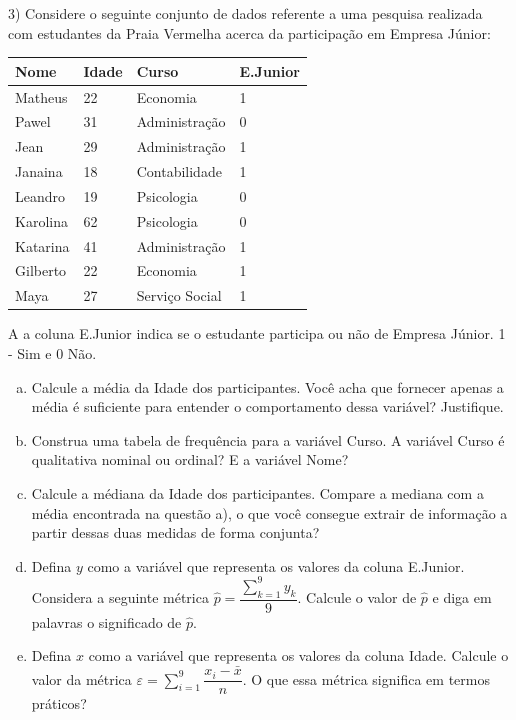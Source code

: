 \documentclass[12pt]{article}
\begin{document}
3) Considere o seguinte conjunto de dados referente a uma pesquisa realizada com estudantes da Praia Vermelha acerca da participação em Empresa Júnior:

\begin{table}[H]
\centering
\begin{tabular}{llll}
\hline
Nome     & Idade & Curso          & E.Junior \\ \hline
Matheus  & 22    & Economia       & 1        \\
Pawel    & 31    & Administração  & 0        \\
Jean     & 29    & Administração  & 1        \\
Janaina  & 18    & Contabilidade  & 1        \\
Leandro  & 19    & Psicologia     & 0        \\
Karolina & 62    & Psicologia     & 0        \\
Katarina & 41    & Administração  & 1        \\
Gilberto & 22    & Economia       & 1        \\
Maya     & 27    & Serviço Social & 1        \\ \hline
\end{tabular}
\end{table}

A a coluna E.Junior indica se o estudante participa ou não de Empresa Júnior. 1 - Sim e 0 Não.

\begin{enumerate}[a)]
    \item Calcule a média da Idade dos participantes. Você acha que fornecer apenas a média é suficiente para entender o comportamento dessa variável? Justifique.
    \item Construa uma tabela de frequência para a variável Curso. A variável Curso é qualitativa nominal ou ordinal? E a variável Nome?
    \item Calcule a médiana da Idade dos participantes. Compare a mediana com a média encontrada na questão a), o que você consegue extrair de informação a partir dessas duas medidas de forma conjunta?
    \item Defina $y$ como a variável que representa os valores da coluna E.Junior. Considera a seguinte métrica 
    $\hat{p}=\dfrac{\displaystyle\sum_{k=1}^{9} y_k}{9} $. Calcule o valor de $\hat{p}$ e diga em palavras o significado de $\hat{p}$.
    \item Defina $x$ como a variável que representa os valores da coluna Idade. Calcule o valor da métrica $\varepsilon = \sum_{i=1}^{9} \dfrac{x_i - \bar{x}}{n}$. O que essa métrica significa em termos práticos?
\end{enumerate}
\end{document}
